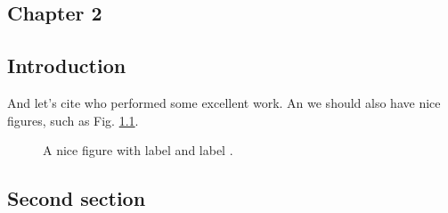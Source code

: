\begin{bibunit}
\setcounter{chapter}{1}
\chapter{Chapter 2}


\section{Introduction}
\Blindtext

And let's cite \citeauthor{small} who performed some excellent
work.\citep{small} An we should also have nice figures, such
as Fig. \ref{fig1}.

\begin{figure}[htb]
   \centering

   \caption{A nice figure \label{fig1} with label
    and label
   .}
\end{figure}

\FloatBarrier

\section{Second section}
\Blindtext

\FloatBarrier

\clearpage
{}
\end{bibunit}
